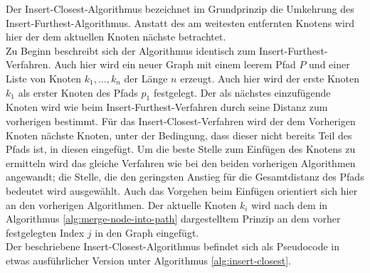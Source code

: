 Der Insert-Closest-Algorithmus bezeichnet im Grundprinzip die Umkehrung des Insert-Furthest-Algorithmus. 
Anstatt des am weitesten entfernten Knotens wird hier der dem aktuellen Knoten nächste betrachtet.
\\
Zu Beginn beschreibt sich der Algorithmus identisch zum Insert-Furthest-Verfahren.
Auch hier wird ein neuer Graph mit einem leerem Pfad $P$ und einer Liste von Knoten $k_1, \dots ,k_n$ der Länge $n$ erzeugt.
Auch hier wird der erste Knoten $k_1$ als erster Knoten des Pfads $p_1$ festgelegt.
Der als nächstes einzufügende Knoten wird wie beim Insert-Furthest-Verfahren durch seine Distanz zum vorherigen bestimmt.
Für das Insert-Closest-Verfahren wird der dem Vorherigen Knoten nächste Knoten, unter der Bedingung, dass dieser nicht bereits Teil des Pfads ist, in diesen eingefügt.
Um die beste Stelle zum Einfügen des Knotens zu ermitteln wird das gleiche Verfahren wie bei den beiden vorherigen Algorithmen angewandt; die Stelle, die den geringsten Anstieg für die Gesamtdistanz des Pfads bedeutet wird ausgewählt.
Auch das Vorgehen beim Einfügen orientiert sich hier an den vorherigen Algorithmen.
Der aktuelle Knoten $k_i$ wird nach dem in Algorithmus \vref{alg:merge-node-into-path} dargestelltem Prinzip an dem vorher festgelegten Index $j$ in den Graph eingefügt.
\\
Der beschriebene Insert-Closest-Algorithmus befindet sich als Pseudocode in etwas ausführlicher Version unter Algorithmus \vref{alg:insert-closest}.
